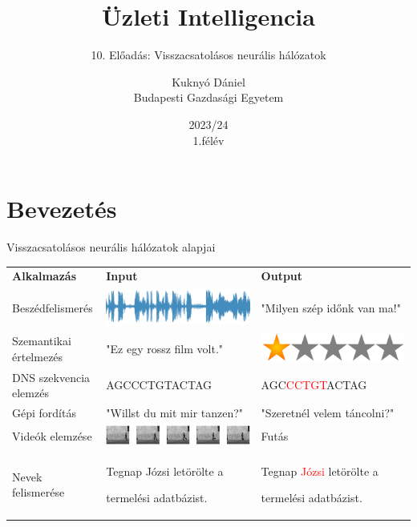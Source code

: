 \documentclass[english, aspectratio=169]{beamer}
\makeatletter
\newcommand\makebeamertitle{\frame{\maketitle}}
\let\origtableofcontents=\tableofcontents
\def\tableofcontents{\@ifnextchar[{\origtableofcontents}{\gobbletableofcontents}}
\def\gobbletableofcontents#1{\origtableofcontents}
\makeatother
\begin{document}
\section{Bevezetés}
\title[]{Üzleti Intelligencia}
\subtitle{10. Előadás: Visszacsatolásos neurális hálózatok}
\author[Kuknyó Dániel]{Kuknyó Dániel\\Budapesti Gazdasági Egyetem}
\date{2023/24\\1.félév}
\makebeamertitle

\begin{frame}
\tableofcontents{}
\end{frame}

\begin{frame}
\tableofcontents[currentsection]
\end{frame}


\begin{frame}{Visszacsatolásos neurális hálózatok alapjai}
\renewcommand{\arraystretch}{2.}
\begin{tabularx}{\textwidth}{m{4cm}m{5cm}m{5cm}}
\textbf{Alkalmazás} & \textbf{Input} & \textbf{Output} \\
	Beszédfelismerés & \includegraphics[width=.25\textwidth, keepaspectratio]{images/recurrent_1.png} & "Milyen szép időnk van ma!" \\
	Szemantikai értelmezés & "Ez egy rossz film volt." & \includegraphics[width=.2\textwidth, keepaspectratio]{images/recurrent_2.png} \\
	DNS szekvencia elemzés & AGCCCTGTACTAG & AGC\textcolor{red}{CCTGT}ACTAG \\
	Gépi fordítás & "Willst du mit mir tanzen?" & "Szeretnél velem táncolni?" \\
	Videók elemzése & \includegraphics[width=.3\textwidth, keepaspectratio]{images/recurrent_3.png} & Futás \\
	Nevek felismerése & Tegnap Józsi letörölte a\par termelési adatbázist. & Tegnap
\textcolor{red}{Józsi} letörölte a\par termelési adatbázist. \\
\end{tabularx}
\end{frame}
\end{document}
